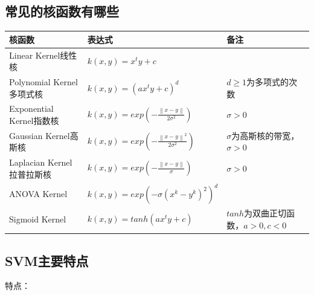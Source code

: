 \subsection{常见的核函数有哪些}

\begin{table}[h]
	\centering
	\begin{tabular}{|p{}|p{}|p{}|}\hline
		核函数 & 表达式 & 备注 \\\hline
		Linear Kernel线性核 & $k(x,y)=x^{t}y+c$ & \\\hline
		Polynomial Kernel多项式核 & $k(x,y)=(ax^{t}y+c)^{d}$ & $d\geqslant1$为多项式的次数\\\hline
		Exponential Kernel指数核 & $k(x,y)=exp(-\frac{\left \|x-y \right \|}{2\sigma ^{2}})$  & $\sigma>0$ \\\hline
		Gaussian Kernel高斯核 & $k(x,y)=exp(-\frac{\left \|x-y \right \|^{2}}{2\sigma ^{2}})$ & $\sigma$为高斯核的带宽，$\sigma>0$ \\\hline
		Laplacian Kernel拉普拉斯核 & $k(x,y)=exp(-\frac{\left \|x-y \right \|}{\sigma})$ & $\sigma>0$ \\\hline
		ANOVA Kernel & $k(x,y)=exp(-\sigma(x^{k}-y^{k})^{2})^{d}$ & \\\hline
		Sigmoid Kernel & $k(x,y)=tanh(ax^{t}y+c)$ & $tanh$为双曲正切函数，$a>0,c<0$ \\\hline
	\end{tabular}
\end{table}

\subsection{SVM主要特点}

特点：

